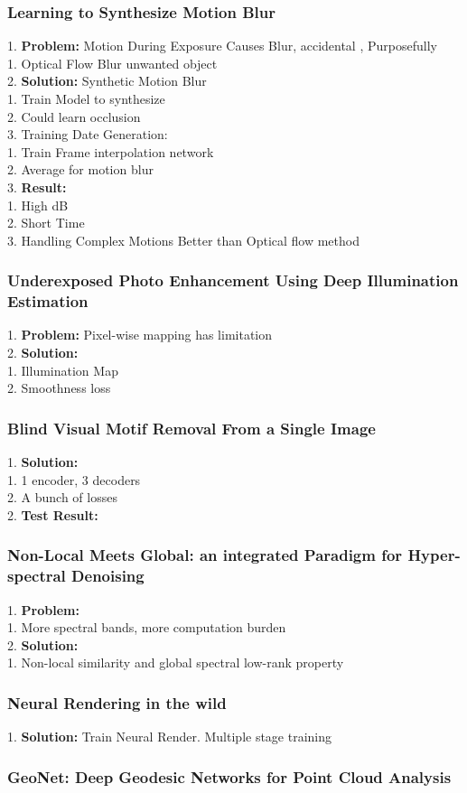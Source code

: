 \subsubsection{Learning to Synthesize Motion Blur}
    1. {\bf Problem:} Motion During Exposure Causes Blur, accidental , Purposefully  \\
        1. Optical Flow Blur unwanted object  \\
    2. {\bf Solution:} Synthetic Motion Blur \\
        1. Train Model to synthesize \\
        2. Could learn occlusion \\
        3. Training Date Generation: \\
            1. Train Frame interpolation network \\
            2. Average for motion blur \\
    3. {\bf Result:} \\
        1. High dB \\
        2. Short Time \\
        3. Handling Complex Motions Better than Optical flow method \\
\subsubsection{Underexposed Photo Enhancement Using Deep Illumination Estimation}
    1. {\bf Problem:} Pixel-wise mapping has limitation \\
    2. {\bf Solution:}  \\
        1. Illumination Map \\
        2. Smoothness loss \\
\subsubsection{Blind Visual Motif Removal From a Single Image}
    1. {\bf Solution:}  \\
        1. 1 encoder, 3 decoders \\
        2. A bunch of losses \\
    2. {\bf Test Result:} \\
\subsubsection{Non-Local Meets Global: an integrated Paradigm for Hyper-spectral Denoising}
    1. {\bf Problem:}  \\
        1. More spectral bands, more computation burden \\
    2. {\bf Solution:}  \\
        1. Non-local similarity and global spectral low-rank property \\
\subsubsection{Neural Rendering in the wild}
    1. {\bf Solution:} Train Neural Render. Multiple stage training \\
\subsubsection{GeoNet: Deep Geodesic Networks for Point Cloud Analysis}